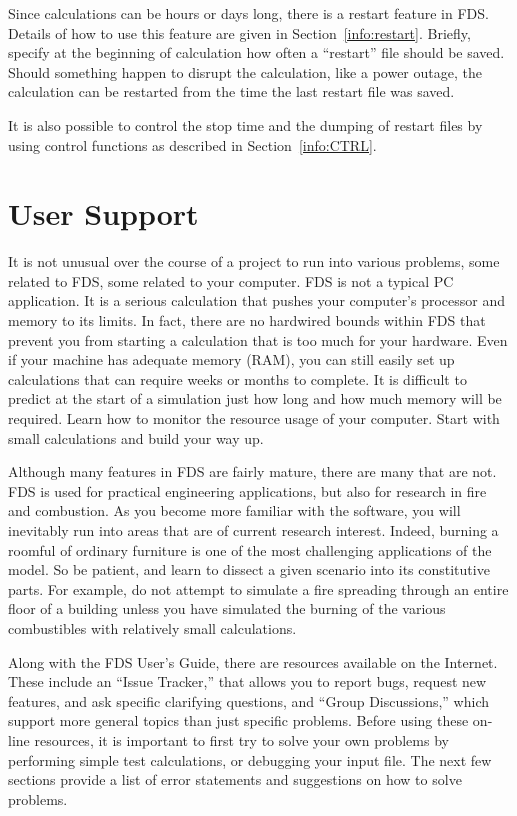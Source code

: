 \documentclass[11pt]{book}
\begin{document}
Since calculations can be hours or days long, there is a restart
feature in FDS. Details of how to use this feature
are given in Section~\ref{info:restart}. Briefly, specify at the
beginning of calculation how often a ``restart'' file should be saved.
Should something happen to disrupt the calculation, like a power
outage, the calculation can be restarted from the time the last restart
file was saved.

It is also possible to control the stop time and the dumping of restart files by using
control functions as described in Section~\ref{info:CTRL}.



\chapter{User Support}

It is not unusual over the course of a
project to run into various problems, some related to FDS, some related to your computer.
FDS is not a typical PC application. It is a serious calculation that pushes your computer's
processor and memory to its limits. In fact, there are no hardwired bounds within FDS that
prevent you from starting a calculation that is too much for your hardware.
Even if your machine has adequate memory (RAM), you can still easily set up calculations that can require
weeks or months to complete. It is difficult to predict at the start of a simulation just how long and
how much memory will be required. Learn how to monitor the resource usage of your computer.
Start with small calculations and build your way up.

Although many features in FDS are fairly mature, there are many that are not. FDS is used for
practical engineering applications, but also for research in fire and combustion. As you become
more familiar with the software, you will inevitably run into areas that are of current research
interest. Indeed, burning a roomful of ordinary furniture is one of the most challenging applications
of the model. So be patient, and learn to dissect a given scenario into its constitutive parts.
For example, do not attempt to simulate a fire spreading through an entire floor of a
building unless you have simulated the burning of the various combustibles with relatively small calculations.

Along with the FDS User's Guide, there are resources available on the Internet.
These include an ``Issue Tracker,'' that allows you to report bugs, request new features, and ask specific clarifying questions,
and ``Group Discussions,'' which support more general topics than just specific problems.
Before using these on-line resources, it is important to first try to solve your own
problems by performing simple test calculations, or debugging your input file. The next few sections
provide a list of error statements and suggestions on how to solve problems.
\end{document}
